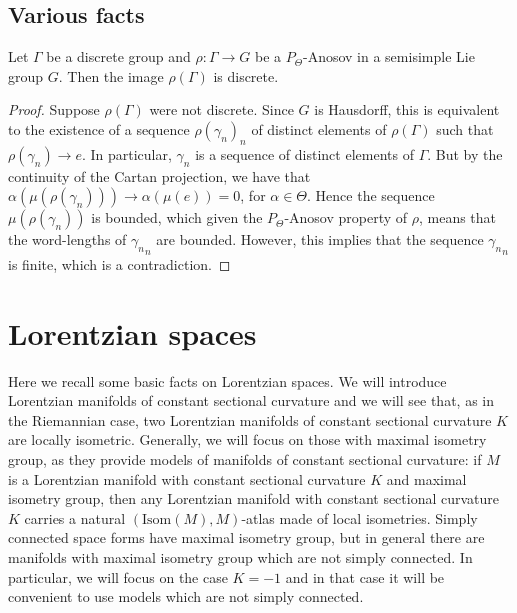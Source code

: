 \documentclass{report}
\begin{document}
\section{Various facts}
\begin{proposition}
    Let $\Gamma$ be a discrete group and $\rho: \Gamma \to G$ be a $P_\Theta$-Anosov in a semisimple Lie group $G$.
    Then the image $\rho(\Gamma)$ is discrete.
\end{proposition}
\begin{proof}
    Suppose $\rho(\Gamma)$ were not discrete.
    Since $G$ is Hausdorff, this is equivalent to the existence of a sequence ${\rho(\gamma_n)}_n$ of distinct elements of $\rho(\Gamma)$ such that $\rho(\gamma_n) \to e$.
    In particular, $\gamma_n$ is a sequence of distinct elements of $\Gamma$.
    But by the continuity of the Cartan projection, we have that $\alpha(\mu(\rho(\gamma_n))) \to \alpha(\mu(e)) = 0$, for $\alpha \in \Theta$.
    Hence the sequence $\mu(\rho(\gamma_n))$ is bounded, which given the $P_\Theta$-Anosov property of $\rho$, means that the word-lengths of ${\gamma_n}_n$ are bounded.
    However, this implies that the sequence ${\gamma_n}_n$ is finite, which is a contradiction.
\end{proof}

\chapter{Lorentzian spaces}
Here we recall some basic facts on Lorentzian spaces.
We will introduce Lorentzian manifolds of constant sectional curvature and we will see that, as in the Riemannian case, two Lorentzian manifolds of constant sectional curvature $K$ are locally isometric.
Generally, we will focus on those with maximal isometry group, as they provide models of manifolds of constant sectional curvature: if $M$ is a Lorentzian manifold with constant sectional curvature $K$ and maximal isometry group, then any Lorentzian manifold with constant sectional curvature $K$ carries a natural $(\mathrm{Isom}(M), M)$-atlas made of local isometries. Simply connected space forms have maximal isometry group, but in general there are manifolds with maximal isometry group which are not simply connected.
In particular, we will focus on the case $K=-1$ and in that case it will be convenient to use  models which are not simply connected.
\end{document}
